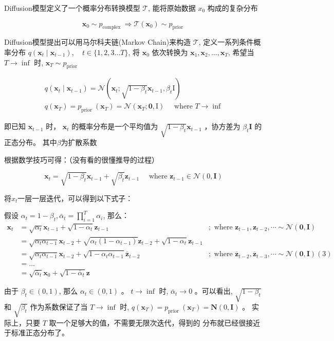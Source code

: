 \documentclass[]{ctexart}
\begin{document}
Diffusion模型定义了一个概率分布转换模型 $\mathcal{T}$, 能将原始数据 $x_0$ 构成的复杂分布

$$
\mathbf{x}_0 \sim p_{\text {complex }} \Longrightarrow \mathcal{T}\left(\mathbf{x}_0\right) \sim p_{\text {prior }}
$$

Diffusion模型提出可以用马尔科夫链(Markov Chain)来构造 $\mathcal{T}$, 定义一系列条件概率分布 $q\left(\mathbf{x}_t \mid \mathbf{x}_{t-1}\right), \quad t \in\{1,2,3 \ldots T\}$, 
将 $\mathbf{x}_0$ 依次转换为 $\mathbf{x}_1, \mathbf{x}_2, \ldots, \mathbf{x}_T$, 希望当 $T \rightarrow \inf$ 时, $\mathbf{x}_T \sim p_{\text {prior }}$

$$
\begin{gathered}
q\left(\mathbf{x}_t \mid \mathbf{x}_{t-1}\right)=\mathcal{N}\left(\mathbf{x}_t ; \sqrt{1-\beta_t} \mathbf{x}_{t-1}, \beta_t \mathrm{I}\right) \\
q\left(\mathbf{x}_T\right)=p_{\text {prior }}\left(\mathbf{x}_T\right)=\mathcal{N}\left(\mathbf{x}_T ; \mathbf{0}, \mathrm{I}\right) \quad \text { where } T \rightarrow \inf
\end{gathered}
$$

即已知 $\mathbf{x}_{t-1}$ 时， $\mathbf{x}_t$ 的概率分布是一个平均值为 $\sqrt{1-\beta_t} \mathbf{x}_{t-1}$ ，协方差为 $\beta_t \mathbf{I}$ 的正态分布。
其中$\beta$为扩散系数

根据数学技巧可得：（没有看的很懂推导的过程）

$$
\mathbf{x}_t=\sqrt{1-\beta_t} \mathbf{x}_{t-1}+\sqrt{\beta_t} \mathbf{z}_{t-1} \quad \text { where } \mathbf{z}_{t-1} \in \mathcal{N}(0, \mathbf{I})
$$

将$x_t$一层一层迭代，可以得到以下式子：

假设 $\alpha_t=1-\beta_t, \bar{\alpha}_t=\prod_{i=1}^T \alpha_i$, 那么：
$$
\begin{array}{rlr}
\mathbf{x}_t & =\sqrt{\alpha_t} \mathbf{x}_{t-1}+\sqrt{1-\alpha_t} \mathbf{z}_{t-1} & ; \text { where } \mathbf{z}_{t-1}, \mathbf{z}_{t-2}, \cdots \sim \mathcal{N}(\mathbf{0}, \mathbf{I}) \\
& =\sqrt{\alpha_t \alpha_{t-1}} \mathbf{x}_{t-2}+\sqrt{\alpha_t\left(1-\alpha_{t-1}\right)} \mathbf{z}_{t-2}+\sqrt{1-\alpha_t} \mathbf{z}_{t-1} & \\
& =\sqrt{\alpha_t \alpha_{t-1}} \mathbf{x}_{t-2}+\sqrt{1-\alpha_t \alpha_{t-1}} \overline{\mathbf{z}}_{t-2} & ; \text { where } \overline{\mathbf{z}}_{t-2}, \overline{\mathbf{z}}_{t-3}, \cdots \sim \mathcal{N}(\mathbf{0}, \mathbf{I})(3) \\
& =\ldots & \\
& =\sqrt{\bar{\alpha}_t} \mathbf{x}_0+\sqrt{1-\bar{\alpha}_t} \mathbf{z} &
\end{array}
$$

由于 $\beta_t \in(0,1)$, 那么 $\alpha_t \in(0,1)$ 。 $t \rightarrow \inf$ 时, $\bar{\alpha}_t \rightarrow 0$ 。可以看出, $\sqrt{1-\beta_t}$ 和 $\sqrt{\beta_t}$ 
作为系数保证了当 $T \rightarrow \inf$ 时, $q\left(\mathbf{x}_T\right)=p_{\text {prior }}\left(\mathbf{x}_T\right)=\mathbf{N}(0, \mathbf{I})$ 。
实际上，只要 $T$ 取一个足够大的值，不需要无限次迭代，得到的 分布就已经很接近于标准正态分布了。
\end{document}
